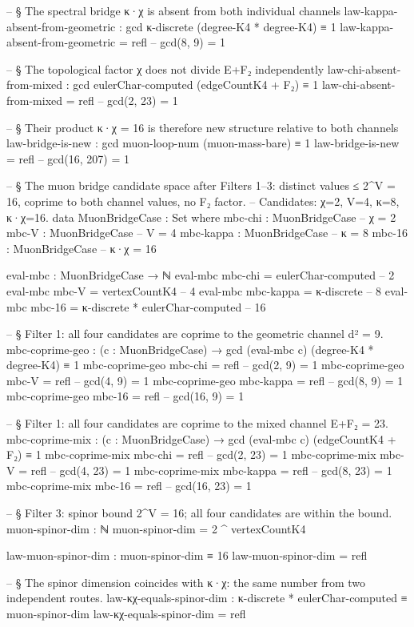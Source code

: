 \documentclass[11pt,a4paper]{book}
\begin{document}
\begin{code}
-- § The spectral bridge κ·χ is absent from both individual channels
law-kappa-absent-from-geometric : gcd κ-discrete (degree-K4 * degree-K4) ≡ 1
law-kappa-absent-from-geometric = refl   -- gcd(8, 9) = 1

-- § The topological factor χ does not divide E+F₂ independently
law-chi-absent-from-mixed : gcd eulerChar-computed (edgeCountK4 + F₂) ≡ 1
law-chi-absent-from-mixed = refl         -- gcd(2, 23) = 1

-- § Their product κ·χ = 16 is therefore new structure relative to both channels
law-bridge-is-new : gcd muon-loop-num (muon-mass-bare) ≡ 1
law-bridge-is-new = refl                 -- gcd(16, 207) = 1

-- § The muon bridge candidate space after Filters 1–3: distinct values ≤ 2^V = 16, coprime to both channel values, no F₂ factor.
-- Candidates: χ=2, V=4, κ=8, κ·χ=16.
data MuonBridgeCase : Set where
  mbc-chi   : MuonBridgeCase   -- χ = 2
  mbc-V     : MuonBridgeCase   -- V = 4
  mbc-kappa : MuonBridgeCase   -- κ = 8
  mbc-16    : MuonBridgeCase   -- κ·χ = 16

eval-mbc : MuonBridgeCase → ℕ
eval-mbc mbc-chi   = eulerChar-computed              -- 2
eval-mbc mbc-V     = vertexCountK4                   -- 4
eval-mbc mbc-kappa = κ-discrete                      -- 8
eval-mbc mbc-16    = κ-discrete * eulerChar-computed -- 16

-- § Filter 1: all four candidates are coprime to the geometric channel d² = 9.
mbc-coprime-geo : (c : MuonBridgeCase) → gcd (eval-mbc c) (degree-K4 * degree-K4) ≡ 1
mbc-coprime-geo mbc-chi   = refl  -- gcd(2, 9) = 1
mbc-coprime-geo mbc-V     = refl  -- gcd(4, 9) = 1
mbc-coprime-geo mbc-kappa = refl  -- gcd(8, 9) = 1
mbc-coprime-geo mbc-16    = refl  -- gcd(16, 9) = 1

-- § Filter 1: all four candidates are coprime to the mixed channel E+F₂ = 23.
mbc-coprime-mix : (c : MuonBridgeCase) → gcd (eval-mbc c) (edgeCountK4 + F₂) ≡ 1
mbc-coprime-mix mbc-chi   = refl  -- gcd(2, 23) = 1
mbc-coprime-mix mbc-V     = refl  -- gcd(4, 23) = 1
mbc-coprime-mix mbc-kappa = refl  -- gcd(8, 23) = 1
mbc-coprime-mix mbc-16    = refl  -- gcd(16, 23) = 1

-- § Filter 3: spinor bound 2^V = 16; all four candidates are within the bound.
muon-spinor-dim : ℕ
muon-spinor-dim = 2 ^ vertexCountK4

law-muon-spinor-dim : muon-spinor-dim ≡ 16
law-muon-spinor-dim = refl

-- § The spinor dimension coincides with κ·χ: the same number from two independent routes.
law-κχ-equals-spinor-dim : κ-discrete * eulerChar-computed ≡ muon-spinor-dim
law-κχ-equals-spinor-dim = refl


\end{code}
\end{document}
